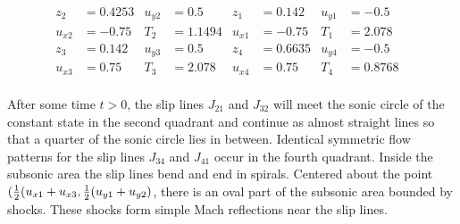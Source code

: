 \documentclass{rsproca}%
\begin{document}
\begin{align*}
z_2	&=0.4253& 	u_{y2}&=0.5& 	z_1&=0.142& 		u_{y1}&=-0.5& \\
u_{x2}&=-0.75&	T_2&=1.1494& 	u_{x1}&=-0.75& 	T_1&=2.078&		\\
z_3&=0.142&			u_{y3}&=0.5& 	z_4&=0.6635& 		u_{y4}&=-0.5&	\\
u_{x3}&=0.75&		T_3&=2.078& 	u_{x4}&=0.75& 	T_4&=0.8768&	\\
\end{align*}

After some time $t> 0$, the slip lines $J_{21}$ and $J_{32}$ will meet the sonic circle of the constant state in the second quadrant and continue as almost straight lines so that a quarter of the sonic circle lies in between.  Identical symmetric flow patterns for the slip lines $J_{34}$ and $J_{41}$ occur in the fourth quadrant. Inside the subsonic area the slip lines bend and end in spirals.  Centered about the point $({1\over 2}(u_{x1} +u_{x3},{1\over 2}(u_{y1} +u_{y2})$, there is an oval part of the subsonic area bounded by shocks. These shocks form simple Mach reflections near the slip lines.  \\
\end{document}

